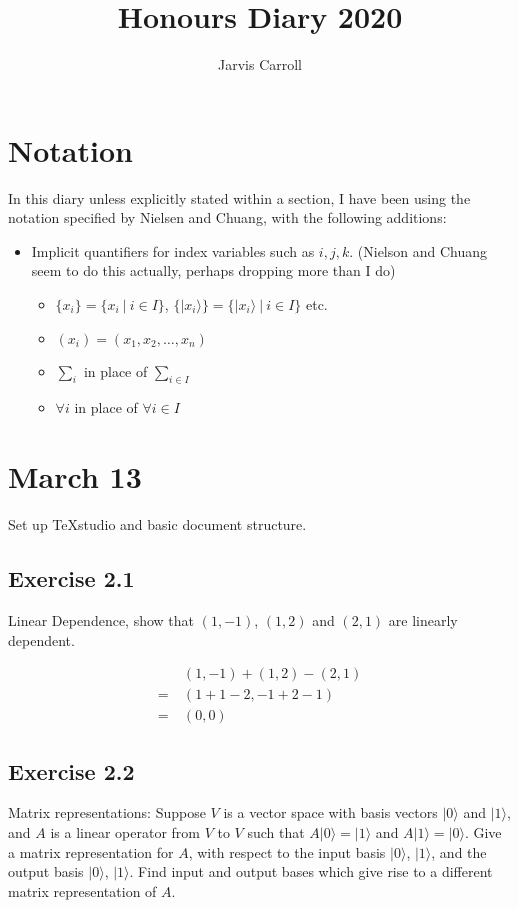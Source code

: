 \documentclass[]{article}
\title{Honours Diary 2020}
\author{Jarvis Carroll}
\newcommand{\ket}[1]{| #1 \rangle}
\begin{document}
\maketitle

\section{Notation}

In this diary unless explicitly stated within a section, I have been using the notation specified by Nielsen and Chuang, with the following additions:
\begin{itemize}
	\item Implicit quantifiers for index variables such as $i, j, k$. (Nielson and Chuang seem to do this actually, perhaps dropping more than I do)
	\begin{itemize}
		\item $\{x_i\} = \{x_i\ |\ i \in I\}$, $\{\ket{x_i}\} = \{\ket{x_i}\ |\ i \in I\}$ etc.
		\item $(x_i) = (x_1, x_2, \ldots, x_n)$
		\item $\sum_i$ in place of $\sum_{i \in I}$
		\item $\forall i$ in place of $\forall i \in I$
	\end{itemize}
\end{itemize}

\section{March 13}

Set up TeXstudio and basic document structure.

\subsection{Exercise 2.1}
Linear Dependence, show that $(1,-1)$, $(1,2)$ and $(2,1)$ are linearly dependent.

\begin{align*}
	&(1, -1) + (1, 2) - (2, 1) \\
=\ &(1+1-2, -1+2-1) \\
=\ &(0, 0)
\end{align*}

\subsection{Exercise 2.2}
Matrix representations: Suppose $V$ is a vector space with basis vectors
$\ket{0}$ and $\ket{1}$, and $A$ is a linear operator from $V$ to $V$ such that
$A\ket{0}=\ket{1}$ and $A\ket{1}=\ket{0}$. Give a matrix representation for
$A$, with respect to the input basis $\ket{0}$, $\ket{1}$, and the output basis
$\ket{0}$, $\ket{1}$. Find input and output bases which give rise to a different matrix representation of $A$.
\end{document}
